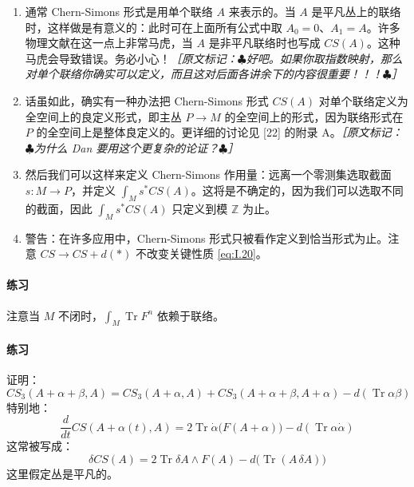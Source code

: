 \begin{enumerate}
  \item 通常 Chern-Simons 形式是用单个联络 $A$ 来表示的。当 $A$ 是平凡丛上的联络时，这样做是有意义的：此时可在上面所有公式中取 $A_0=0$、$A_1=A$。许多物理文献在这一点上非常马虎，当 $A$ 是非平凡联络时也写成 $CS(A)$。这种马虎会导致错误。务必小心！{\small\itshape ［原文标记：$\clubsuit$好吧。如果你取指数映射，那么对单个联络你\emph{确实}可以定义，而且这对后面各讲余下的内容很重要！！！$\clubsuit$］}
  \item 话虽如此，确实有一种办法把 Chern-Simons 形式 $CS(A)$ 对单个联络定义为全空间上的良定义形式，即主丛 $P\to M$ 的全空间上的形式，因为联络形式在 $P$ 的全空间上是整体良定义的。更详细的讨论见 [22] 的附录 A。{\small\itshape ［原文标记：$\clubsuit$为什么 Dan 要用这个更复杂的论证？$\clubsuit$］}
  \item 然后我们可以这样来定义 Chern-Simons 作用量：远离一个零测集选取截面 $s: M\to P$，并定义 $\int_M s^*CS(A)$。这将是不确定的，因为我们可以选取不同的截面，因此 $\int_M s^*CS(A)$ 只定义到模 $\mathbb{Z}$ 为止。
  \item 警告：在许多应用中，Chern-Simons 形式只被看作定义到恰当形式为止。注意 $CS\to CS+d(*)$ 不改变关键性质 \eqref{eq:I.20}。
\end{enumerate}

\paragraph{练习}
注意当 $M$ 不闭时，$\int_M\operatorname{Tr}F^n$ 依赖于联络。

\paragraph{练习}
证明：
\begin{equation}
  CS_3(A+\alpha+\beta,A)
  = CS_3(A+\alpha,A)+CS_3(A+\alpha+\beta,A+\alpha)-d(\operatorname{Tr}\alpha\beta)
  \tag{I.34}
  \label{eq:I.34}
\end{equation}
特别地：
\begin{equation}
  \frac{d}{dt}CS(A+\alpha(t),A)
  = 2\operatorname{Tr}\dot{\alpha}\big(F(A+\alpha)\big)-d(\operatorname{Tr}\alpha\dot{\alpha})
  \tag{I.35}
  \label{eq:I.35}
\end{equation}
这常被写成：
\begin{equation}
  \delta CS(A) = 2\operatorname{Tr}\delta A\wedge F(A)-d\big(\operatorname{Tr}(A\,\delta A)\big)
  \tag{I.36}
  \label{eq:I.36}
\end{equation}
这里假定丛是平凡的。

